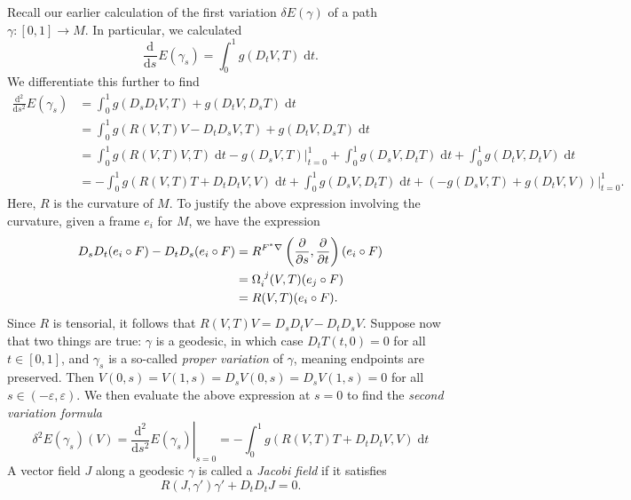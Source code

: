 \documentclass{book}
\renewcommand{\d}{\mathrm{d}}
\renewcommand{\epsilon}{\varepsilon}
\newcommand{\parens}[1]{\left( {#1} \right)}
\newcommand{\pdv}[2]{\frac{\partial{#1}}{\partial{#2}}}
\newcommand{\odv}[3][]{\frac{\d^{#1}#2}{\d{#3}^{#1}}}
\theoremstyle{definition}
\numberwithin{equation}{section}
\begin{document}
Recall our earlier calculation of the first variation $\delta E(\gamma)$ of a path $\gamma \colon [0,1] \to M$. In particular, we calculated 
\begin{equation}
    \odv{}{s} E(\gamma_s) = \int_0^1 g(D_t V, T) \; \d{t}.
\end{equation}
We differentiate this further to find 
\begin{equation} \begin{aligned}
    \odv[2]{}{s} E(\gamma_s)
    &= \int_0^1 g(D_s D_t V, T) + g(D_t V, D_s T) \; \d{t} \\
    &= \int_0^1 g(R(V,T) V - D_t D_s V, T) + g(D_t V, D_s T) \; \d{t} \\
    &= \int_0^1 g(R(V,T)V, T) \; \d{t} - \left. g(D_s V, T) \right\vert_{t=0}^1 + \int_0^1 g(D_s V, D_t T) \; \d{t} + \int_0^1 g(D_t V, D_t V) \; \d{t} \\
    &= - \int_0^1 g(R(V,T)T + D_t D_t V, V) \; \d{t} + \int_0^1 g(D_s V, D_t T) \; \d{t} + \left. \left( - g(D_s V,T) + g(D_t V, V)  \right) \right\vert_{t=0}^1.
\end{aligned} \end{equation}
Here, $R$ is the curvature of $M$. To justify the above expression involving the curvature, given a frame $e_i$ for $M$, we have the expression 
\begin{equation} \begin{aligned}
    D_s D_t (e_i \circ F) - D_t D_s (e_i \circ F)
    &= R^{F^* \nabla}\parens{ \pdv{}{s}, \pdv{}{t} }(e_i \circ F) \\
    &= \tensor{\Omega}{_i^j}(V,T) (e_j \circ F) \\
    &= R(V,T) (e_i \circ F).
\end{aligned} \end{equation}
Since $R$ is tensorial, it follows that $R(V,T)V = D_s D_t V - D_t D_s V$. Suppose now that two things are true: $\gamma$ is a geodesic, in which case $D_t T(t,0) = 0$ for all $t \in [0,1]$, and $\gamma_s$ is a so-called \textit{proper variation} of $\gamma$, meaning endpoints are preserved. Then $V(0,s) = V(1,s) = D_s V(0,s) = D_s V(1,s) = 0$ for all $s \in (-\epsilon,\epsilon)$. We then evaluate the above expression at $s = 0$ to find the \textit{second variation formula}
\begin{equation}
    \delta^2 E(\gamma_s)(V) 
    = \left. \odv[2]{}{s} E(\gamma_s) \right\vert_{s=0} 
    = - \int_0^1 g(R(V,T)T + D_t D_t V, V) \; \d{t}
\end{equation}
A vector field $J$ along a geodesic $\gamma$ is called a \textit{Jacobi field} if it satisfies 
\begin{equation}
    R(J,\gamma')\gamma' + D_t D_t J = 0.
\end{equation}
\end{document}
